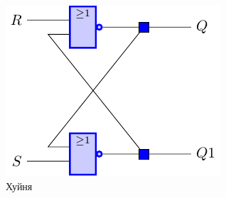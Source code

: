 	\begin{figure}[h!]
		\centering
		\includegraphics{./images/task5}
		\caption{Хуйня}
	\end{figure}


